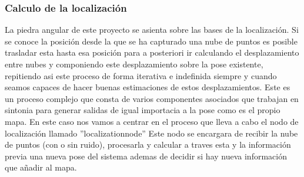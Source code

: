 \documentclass[12pt, a4paper, twoside]{article}
\begin{document}
\subsubsection{Calculo de la localización}
La piedra angular de este proyecto se asienta sobre las bases de la localización. Si se conoce la posición desde la que se ha capturado una nube de puntos
es posible trasladar esta hasta esa posición para a posteriori ir calculando el desplazamiento entre nubes y componiendo este desplazamiento sobre la pose
existente, repitiendo asi este proceso de forma iterativa e indefinida siempre y cuando seamos capaces de hacer buenas estimaciones de estos desplazamientos. \newline
Este es un proceso complejo que consta de varios componentes asociados que trabajan en sintonia para generar salidas de igual importacia a la pose como 
es el propio mapa. En este caso nos vamos a centrar en el proceso que lleva a cabo el nodo de localización llamado ''localization\textunderscore node''
Este nodo se encargara de recibir la nube de puntos (con o sin ruido), procesarla y calcular a traves esta y la información previa una nueva pose del sistema
ademas de decidir si hay nueva información que añadir al mapa.
\end{document}

